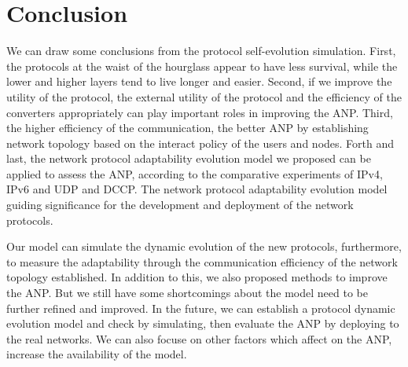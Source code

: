 \documentclass{article}
\begin{document}
\section{Conclusion}
We can draw some conclusions from the protocol self-evolution simulation. First,  the protocols at the waist of 
the hourglass appear to have less survival, while the lower and higher layers tend to live longer and easier. 
Second, if we improve the utility of the protocol, the external utility of the protocol and the efficiency of 
the converters appropriately can play important roles in improving the ANP. Third, the higher efficiency of the 
communication, the better ANP by establishing network topology based on the interact policy of the users and 
nodes. Forth and last, the network protocol adaptability evolution model we proposed can be applied to assess 
the ANP, according to the comparative experiments of IPv4, IPv6 and UDP and DCCP. The network protocol adaptability 
evolution model guiding significance for the development and deployment of the network protocols.

Our model can simulate the dynamic evolution of the new protocols, furthermore, to measure the adaptability 
through the communication efficiency of the network topology established. In addition to this, we also proposed 
methods to improve the ANP. But we still have some shortcomings about the model need to be further refined and 
improved. In the future, we can establish a protocol dynamic evolution model and check by simulating,  then 
evaluate the ANP by deploying to the real networks. We can also focuse on other factors which affect on the 
ANP, increase the availability of the model.
\end{document}
